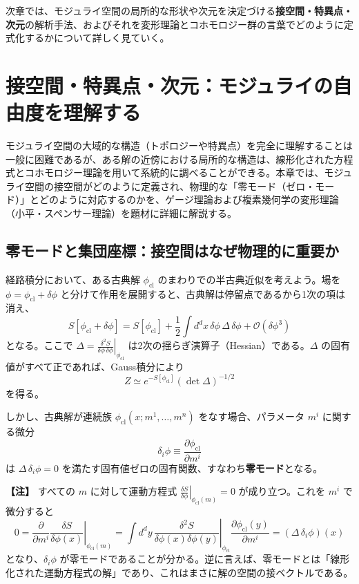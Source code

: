 \documentclass[uplatex, dvipdfmx, book]{jsbook}
\let\origsection\section
\let\origsubsection\subsection
\let\origsubsubsection\subsubsection
\newcommand{\chapter}{\origsection}
\renewcommand{\section}{\origsubsection}
\renewcommand{\subsection}{\origsubsubsection}
\renewcommand{\subsubsection}{\paragraph}
\newenvironment{note}{\vspace{1ex}\par\footnotesize\noindent\textbf{【注】}}{\par\vspace{1ex}}
\begin{document}
次章では、モジュライ空間の局所的な形状や次元を決定づける\textbf{接空間・特異点・次元}の解析手法、およびそれを変形理論とコホモロジー群の言葉でどのように定式化するかについて詳しく見ていく。
\chapter{接空間・特異点・次元：モジュライの自由度を理解する}
\label{ch:deformation}

モジュライ空間の大域的な構造（トポロジーや特異点）を完全に理解することは一般に困難であるが、ある解の近傍における局所的な構造は、線形化された方程式とコホモロジー理論を用いて系統的に調べることができる。本章では、モジュライ空間の接空間がどのように定義され、物理的な「零モード（ゼロ・モード）」とどのように対応するのかを、ゲージ理論および複素幾何学の変形理論（小平・スペンサー理論）を題材に詳細に解説する。

\section{零モードと集団座標：接空間はなぜ物理的に重要か}

経路積分において、ある古典解 $\phi_{\text{cl}}$ のまわりでの半古典近似を考えよう。場を $\phi = \phi_{\text{cl}} + \delta\phi$ と分けて作用を展開すると、古典解は停留点であるから1次の項は消え、
\begin{equation}
    S[\phi_{\text{cl}} + \delta\phi] = S[\phi_{\text{cl}}] + \frac{1}{2}\int d^dx\, \delta\phi\, \Delta\, \delta\phi + \mathcal{O}(\delta\phi^3)
\end{equation}
となる。ここで $\Delta = \left.\frac{\delta^2 S}{\delta\phi\,\delta\phi}\right|_{\phi_{\text{cl}}}$ は2次の揺らぎ演算子（Hessian）である。$\Delta$ の固有値がすべて正であれば、Gauss積分により
\begin{equation}
    Z \simeq e^{-S[\phi_{\text{cl}}]} \left(\det \Delta\right)^{-1/2}
\end{equation}
を得る。

しかし、古典解が連続族 $\phi_{\text{cl}}(x; m^1, \dots, m^n)$ をなす場合、パラメータ $m^i$ に関する微分
\begin{equation}
    \delta_i \phi \equiv \frac{\partial \phi_{\text{cl}}}{\partial m^i}
\end{equation}
は $\Delta\,\delta_i\phi = 0$ を満たす固有値ゼロの固有関数、すなわち\textbf{零モード}となる。

\begin{note}
すべての $m$ に対して運動方程式 $\left.\frac{\delta S}{\delta \phi}\right|_{\phi_{\text{cl}}(m)} = 0$ が成り立つ。これを $m^i$ で微分すると
\begin{equation}
    0 = \frac{\partial}{\partial m^i}\left.\frac{\delta S}{\delta \phi(x)}\right|_{\phi_{\text{cl}}(m)} = \int d^dy\, \left.\frac{\delta^2 S}{\delta \phi(x)\delta\phi(y)}\right|_{\phi_{\text{cl}}} \frac{\partial \phi_{\text{cl}}(y)}{\partial m^i} = (\Delta\, \delta_i\phi)(x)
\end{equation}
となり、$\delta_i\phi$ が零モードであることが分かる。逆に言えば、零モードとは「線形化された運動方程式の解」であり、これはまさに解の空間の接ベクトルである。
\end{note}
\end{document}
